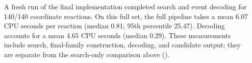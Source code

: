 A fresh run of the final implementation completed search and event decoding for 140/140 coordinate reactions. On this full set, the full pipeline takes a mean 6.07 CPU seconds per reaction (median 0.81; 95th percentile 25.47). Decoding accounts for a mean 4.65 CPU seconds (median 0.29). These measurements include search, final-family construction, decoding, and candidate output; they are separate from the search-only comparison above ().
